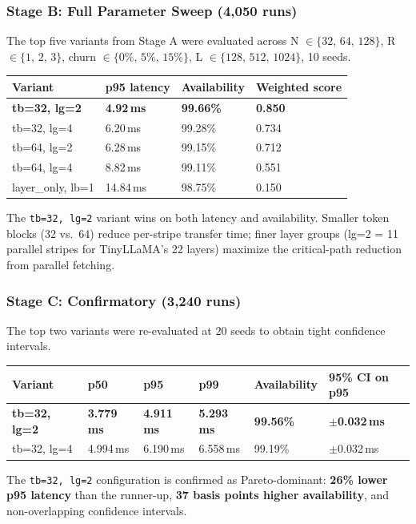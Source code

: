 \documentclass[11pt]{article}
\begin{document}
\subsubsection{Stage B: Full Parameter Sweep (4,050 runs)}

The top five variants from Stage A were evaluated across N $\in
\{32,\,64,\,128\}$, R $\in \{1,\,2,\,3\}$, churn $\in \{0\%,\,5\%,\,15\%\}$,
L $\in \{128,\,512,\,1024\}$, 10 seeds.

\begin{longtable}[]{@{}llll@{}}
\toprule
Variant & p95 latency & Availability & Weighted score \\
\midrule
\endhead
\bottomrule
\endlastfoot
\textbf{tb=32, lg=2} & \textbf{4.92\,ms} & \textbf{99.66\%} & \textbf{0.850} \\
tb=32, lg=4 & 6.20\,ms & 99.28\% & 0.734 \\
tb=64, lg=2 & 6.28\,ms & 99.15\% & 0.712 \\
tb=64, lg=4 & 8.82\,ms & 99.11\% & 0.551 \\
layer\_only, lb=1 & 14.84\,ms & 98.75\% & 0.150 \\
\end{longtable}

The \texttt{tb=32, lg=2} variant wins on both latency and availability.
Smaller token blocks (32 vs.\ 64) reduce per-stripe transfer time; finer
layer groups (lg=2 = 11 parallel stripes for TinyLLaMA's 22 layers)
maximize the critical-path reduction from parallel fetching.

\subsubsection{Stage C: Confirmatory (3,240 runs)}

The top two variants were re-evaluated at 20 seeds to obtain tight
confidence intervals.

\begin{longtable}[]{@{}llllll@{}}
\toprule
Variant & p50 & p95 & p99 & Availability & 95\% CI on p95 \\
\midrule
\endhead
\bottomrule
\endlastfoot
\textbf{tb=32, lg=2} & \textbf{3.779\,ms} & \textbf{4.911\,ms} & \textbf{5.293\,ms} & \textbf{99.56\%} & \textbf{$\pm$0.032\,ms} \\
tb=32, lg=4 & 4.994\,ms & 6.190\,ms & 6.558\,ms & 99.19\% & $\pm$0.032\,ms \\
\end{longtable}

The \texttt{tb=32, lg=2} configuration is confirmed as Pareto-dominant:
\textbf{26\% lower p95 latency} than the runner-up, \textbf{37 basis
points higher availability}, and non-overlapping confidence intervals.
\end{document}
